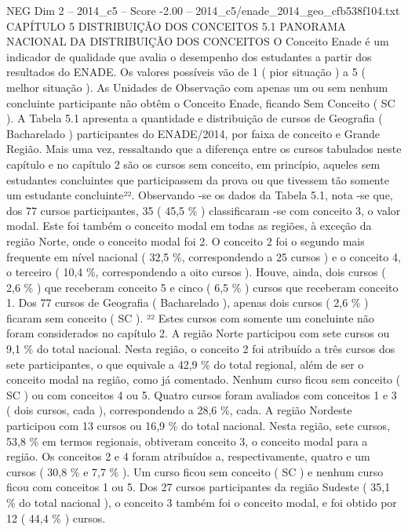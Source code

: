 \begin{textsample}{NEG Dim 2 – 2014\_c5 – Score -2.00 – 2014\_c5/enade\_2014\_geo\_cfb538f104.txt}  \label{ex:f2_neg_127}
CAPÍTULO 5 DISTRIBUIÇÃO DOS CONCEITOS 5.1 PANORAMA NACIONAL DA DISTRIBUIÇÃO DOS CONCEITOS O Conceito Enade é um indicador de qualidade que avalia o desempenho dos estudantes a partir dos resultados do ENADE.
Os valores possíveis vão de 1 ( pior situação ) a 5 ( melhor situação ).
As Unidades de Observação com apenas um ou sem nenhum concluinte participante não obtêm o Conceito Enade, ficando Sem Conceito ( SC ).
A Tabela 5.1 apresenta a quantidade e distribuição de cursos de Geografia ( Bacharelado ) participantes do ENADE/2014, por faixa de conceito e Grande Região.
Mais uma vez, ressaltando que a diferença entre os cursos tabulados neste capítulo e no capítulo 2 são os cursos sem conceito, em princípio, aqueles sem estudantes concluintes que participassem da prova ou que tivessem tão somente um estudante concluinte²².
Observando -se os dados da Tabela 5.1, nota -se que, dos 77 cursos participantes, 35 ( 45,5 \% ) classificaram -se com conceito 3, o valor modal.
Este foi também o conceito modal em todas as regiões, à exceção da região Norte, onde o conceito modal foi 2.
O conceito 2 foi o segundo mais frequente em nível nacional ( 32,5 \%, correspondendo a 25 cursos ) e o conceito 4, o terceiro ( 10,4 \%, correspondendo a oito cursos ).
Houve, ainda, dois cursos ( 2,6 \% ) que receberam conceito 5 e cinco ( 6,5 \% ) cursos que receberam conceito 1.
Dos 77 cursos de Geografia ( Bacharelado ), apenas dois cursos ( 2,6 \% ) ficaram sem conceito ( SC ). ²² Estes cursos com somente um concluinte não foram considerados no capítulo 2.
A região Norte participou com sete cursos ou 9,1 \% do total nacional.
Nesta região, o conceito 2 foi atribuído a três cursos dos sete participantes, o que equivale a 42,9 \% do total regional, além de ser o conceito modal na região, como já comentado.
Nenhum curso ficou sem conceito ( SC ) ou com conceitos 4 ou 5.
Quatro cursos foram avaliados com conceitos 1 e 3 ( dois cursos, cada ), correspondendo a 28,6 \%, cada.
A região Nordeste participou com 13 cursos ou 16,9 \% do total nacional.
Nesta região, sete cursos, 53,8 \% em termos regionais, obtiveram conceito 3, o conceito modal para a região.
Os conceitos 2 e 4 foram atribuídos a, respectivamente, quatro e um cursos ( 30,8 \% e 7,7 \% ).
Um curso ficou sem conceito ( SC ) e nenhum curso ficou com conceitos 1 ou 5.
Dos 27 cursos participantes da região Sudeste ( 35,1 \% do total nacional ), o conceito 3 também foi o conceito modal, e foi obtido por 12 ( 44,4 \% ) cursos.

\end{textsample}
